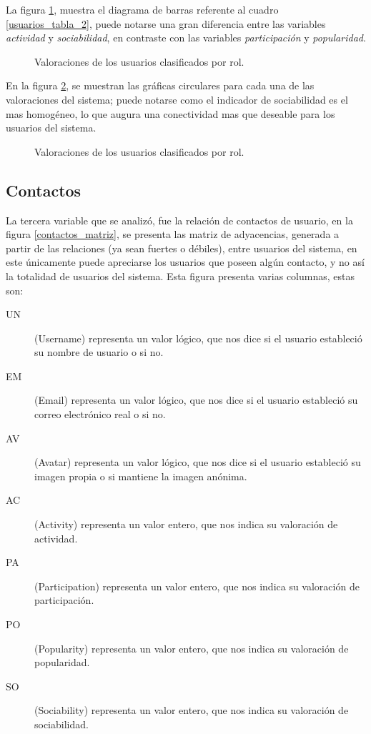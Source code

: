 La figura \ref{usuarios_bars_2}, muestra el diagrama de barras referente al
cuadro \ref{usuarios_tabla_2}, puede notarse una gran diferencia entre las
variables \emph{actividad} y \emph{sociabilidad}, en contraste con las variables
\emph{participación} y \emph{popularidad}.

\begin{figure}
\centering

\caption{Valoraciones de los usuarios clasificados por rol.}
\label{usuarios_bars_2}
\end{figure}

En la figura \ref{usuarios_pie_2}, se muestran las gráficas circulares para cada
una de las valoraciones del sistema; puede notarse como el indicador de
sociabilidad es el mas homogéneo, lo que augura una conectividad mas que
deseable para los usuarios del sistema.

\begin{figure}
\centering

\caption{Valoraciones de los usuarios clasificados por rol.}
\label{usuarios_pie_2}
\end{figure}

\subsection{Contactos}
La tercera variable que se analizó, fue la relación de contactos de usuario,
en la figura \ref{contactos_matriz}, se presenta las matriz de adyacencias,
generada a partir de las relaciones (ya sean fuertes o débiles), entre usuarios
del sistema, en este únicamente puede apreciarse los usuarios que poseen algún
contacto, y no así la totalidad de usuarios del sistema. Esta figura presenta
varias columnas, estas son:

\begin{description}
\item [UN] (Username) representa un valor lógico, que nos dice si el usuario
estableció su nombre de usuario o si no.
\item [EM] (Email) representa un valor lógico, que nos dice si el usuario
estableció su correo electrónico real o si no.
\item [AV] (Avatar) representa un valor lógico, que nos dice si el usuario
estableció su imagen propia o si mantiene la imagen anónima.
\item [AC] (Activity) representa un valor entero, que nos indica su valoración
de actividad.
\item [PA] (Participation) representa un valor entero, que nos indica su
valoración de participación.
\item [PO] (Popularity) representa un valor entero, que nos indica su
valoración de popularidad.
\item [SO] (Sociability) representa un valor entero, que nos indica su
valoración de sociabilidad.
\end{description}

